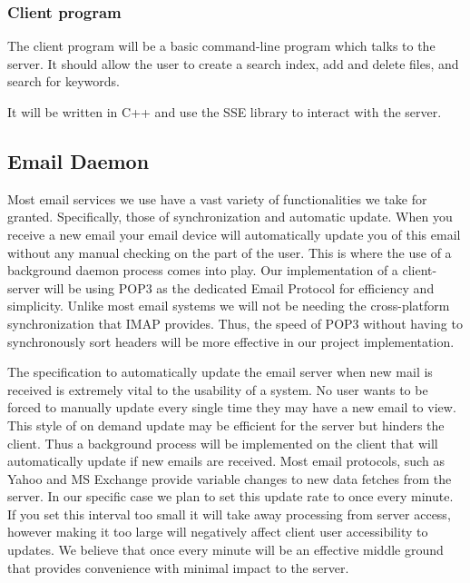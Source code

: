\documentclass[onecolumn, draftclsnofoot,10pt, compsoc]{IEEEtran}
\begin{document}

\subsubsection{ Client program }

The client program will be a basic command-line program which talks to the server. It should allow the user to create a search index, add and delete files, and search for keywords.

It will be written in C++ and use the SSE library to interact with the server.


\subsection{ Email Daemon }
\label{subsec:email}

Most email services we use have a vast variety of functionalities we take for granted. Specifically, those of synchronization and automatic update. When you receive a new email your email device will automatically update you of this email without any manual checking on the part of the user. This is where the use of a background daemon process comes into play. Our implementation of a client-server will be using POP3 as the dedicated Email Protocol for efficiency and simplicity. Unlike most email systems we will not be needing the cross-platform synchronization that IMAP provides. Thus, the speed of POP3 without having to synchronously sort headers will be more effective in our project implementation.

The specification to automatically update the email server when new mail is received is extremely vital to the usability of a system. No user wants to be forced to manually update every single time they may have a new email to view. This style of on demand update may be efficient for the server but hinders the client. Thus a background process will be implemented on the client that will automatically update if new emails are received. Most email protocols, such as Yahoo and MS Exchange provide variable changes to new data fetches from the server. In our specific case we plan to set this update rate to once every minute. If you set this interval too small it will take away processing from server access, however making it too large will negatively affect client user accessibility to updates. We believe that once every minute will be an effective middle ground that provides convenience with minimal impact to the server.
\end{document}
